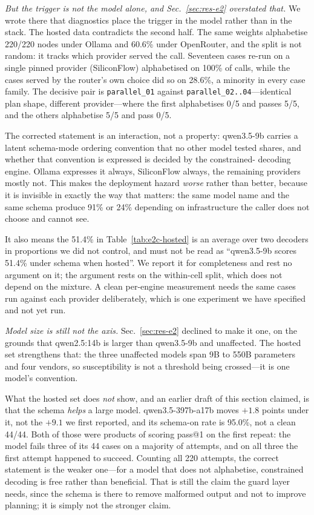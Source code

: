 \documentclass[10pt,twocolumn]{article}
\newcommand{\code}[1]{\texttt{\small #1}}
\begin{document}
\emph{But the trigger is not the model alone, and Sec.~\ref{sec:res-e2}
overstated that.} We wrote there that diagnostics place the trigger in the
model rather than in the stack. The hosted data contradicts the second half.
The same weights alphabetise 220/220 nodes under Ollama and 60.6\% under
OpenRouter, and the split is not random: it tracks which provider served the
call. Seventeen cases re-run on a single pinned provider (SiliconFlow)
alphabetised on 100\% of calls, while the cases served by the router's own
choice did so on 28.6\%, a minority in every case family. The decisive pair is
\code{parallel\_01} against \code{parallel\_02..04}---identical plan shape,
different provider---where the first alphabetises 0/5 and passes 5/5, and the
others alphabetise 5/5 and pass 0/5.

The corrected statement is an interaction, not a property: qwen3.5-9b carries
a latent schema-mode ordering convention that no other model tested shares,
and whether that convention is expressed is decided by the constrained-
decoding engine. Ollama expresses it always, SiliconFlow always, the remaining
providers mostly not. This makes the deployment hazard \emph{worse} rather
than better, because it is invisible in exactly the way that matters: the same
model name and the same schema produce 91\% or 24\% depending on infrastructure
the caller does not choose and cannot see.

It also means the 51.4\% in Table~\ref{tab:e2c-hosted} is an average over two
decoders in proportions we did not control, and must not be read as
``qwen3.5-9b scores 51.4\% under schema when hosted''. We report it for
completeness and rest no argument on it; the argument rests on the within-cell
split, which does not depend on the mixture. A clean per-engine measurement
needs the same cases run against each provider deliberately, which is one
experiment we have specified and not yet run.

\emph{Model size is still not the axis.} Sec.~\ref{sec:res-e2} declined to make
it one, on the grounds that qwen2.5:14b is larger than qwen3.5-9b and
unaffected. The hosted set strengthens that: the three unaffected models span
9B to 550B parameters and four vendors, so susceptibility is not a threshold
being crossed---it is one model's convention.

What the hosted set does \emph{not} show, and an earlier draft of this section
claimed, is that the schema \emph{helps} a large model. qwen3.5-397b-a17b
moves $+1.8$ points under it, not the $+9.1$ we first reported, and its
schema-on rate is 95.0\%, not a clean 44/44. Both of those were products of
scoring pass@1 on the first repeat: the model fails three of its 44 cases on a
majority of attempts, and on all three the first attempt happened to succeed.
Counting all 220 attempts, the correct statement is the weaker one---for a
model that does not alphabetise, constrained decoding is free rather than
beneficial. That is still the claim the guard layer needs, since the schema is
there to remove malformed output and not to improve planning; it is simply not
the stronger claim.
\end{document}
